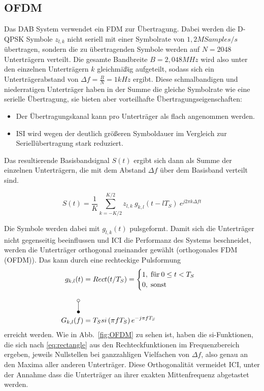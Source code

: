 \subsection{\ac{OFDM}}
\label{sec:ofdm}
Das DAB System verwendet ein \ac{FDM} zur Übertragung. Dabei werden die D-QPSK Symbole $z_{l,k}$ nicht seriell mit einer Symbolrate von $1,2 M Samples / s$ übertragen, sondern die zu übertragenden Symbole werden auf $N=2048$ Unterträgern verteilt. Die gesamte Bandbreite $B = 2,048 MHz$ wird also unter den einzelnen Unterträgern $k$ gleichmäßig aufgeteilt, sodass sich ein Unterträgerabstand von $\Delta f = \frac{B}{N} = 1kHz$ ergibt. Diese schmalbandigen und niederratigen Unterträger haben in der Summe die gleiche Symbolrate wie eine serielle Übertragung, sie bieten aber vorteilhafte Übertragungseigenschaften:
\begin{itemize}
\item Der Übertragungskanal kann pro Unterträger als flach angenommen werden.
\item \ac{ISI} wird wegen der deutlich größeren Symboldauer im Vergleich zur Seriellübertragung stark reduziert.
\end{itemize}
Das resultierende Basisbandsignal $S(t)$ ergibt sich dann als Summe der einzelnen Unterträgern, die mit dem Abstand $\Delta f$ über dem Basisband verteilt sind.

\begin{equation}
    S(t) = \frac{1}{K} \sum \limits_{k=-K/2}^{K/2} z_{l,k} \: g_{k,l}(t-lT_S) \: e^{j2\pi k \Delta f t}
\label{eq:ofdm_dft}
\end{equation}

Die Symbole werden dabei mit $g_{l,k}(t)$ pulsgeformt. Damit sich die Unterträger nicht gegenseitig beeinflussen und \ac{ICI} die Performanz des Systems beschneidet, werden die Unterträger orthogonal zueinander gewählt (orthogonales \ac{FDM} (OFDM)). Das kann durch eine rechteckige Pulsformung 
\begin{equation}
\label{eq:rectangle}
\begin{aligned}
g_{k,l}(t) &= Rect(t/T_S) = 
    \begin{cases}
    1, \; \text{für} \: 0 \leq t < T_S \\
    0, \; \text{sonst}
    \end{cases}\\
\rotatebox{270}{\laplace} \\
G_{k,l}(f) &= T_S si\left(\pi f T_S\right) e^{-j \pi f T_S}
\end{aligned}
\end{equation}
erreicht werden. Wie in Abb.~\ref{fig:OFDM} zu sehen ist, haben die si-Funktionen, die sich nach \ref{eq:rectangle} aus den Rechteckfunktionen im Frequenzbereich ergeben, jeweils Nullstellen bei ganzzahligen Vielfachen von $\Delta f$, also genau an den Maxima aller anderen Unterträger. Diese Orthogonalität vermeidet \ac{ICI}, unter der Annahme dass die Unterträger an ihrer exakten Mittenfrequenz abgetastet werden.

